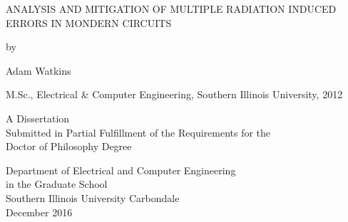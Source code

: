 \begin{center}


ANALYSIS AND MITIGATION OF MULTIPLE RADIATION INDUCED ERRORS IN MONDERN CIRCUITS

\vskip 1.8in

by

Adam Watkins

M.Sc., Electrical \& Computer Engineering, Southern Illinois University, 2012

\vskip 2in

\vbox{\baselineskip=14pt
A Dissertation \\
Submitted in Partial Fulfillment of the Requirements for the \\
Doctor of Philosophy Degree
}

\vskip 2in


\vbox{\baselineskip=14pt
Department of Electrical and Computer Engineering \\
in the Graduate School \\
Southern Illinois University Carbondale \\
December 2016
}

\end{center}
